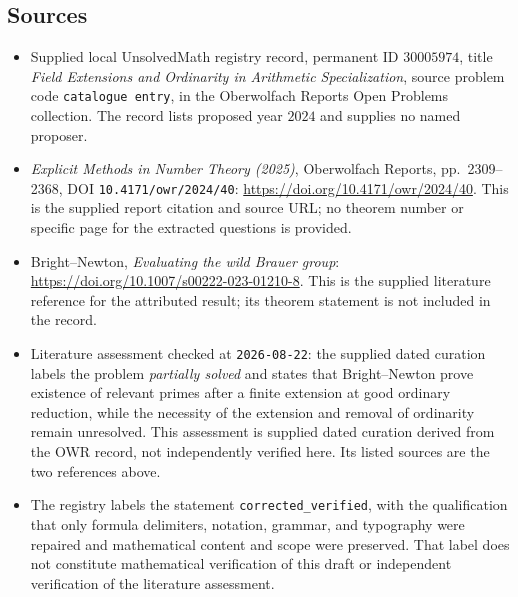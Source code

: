 \documentclass[11pt]{article}
\begin{document}
\subsection{Sources}
\begin{itemize}
\item Supplied local UnsolvedMath registry record, permanent ID \(30005974\), title \emph{Field Extensions and Ordinarity in Arithmetic Specialization}, source problem code \texttt{catalogue entry}, in the Oberwolfach Reports Open Problems collection. The record lists proposed year \(2024\) and supplies no named proposer.
\item \emph{Explicit Methods in Number Theory (2025)}, Oberwolfach Reports, pp.~2309--2368, DOI \texttt{10.4171/owr/2024/40}: \url{https://doi.org/10.4171/owr/2024/40}. This is the supplied report citation and source URL; no theorem number or specific page for the extracted questions is provided.
\item Bright--Newton, \emph{Evaluating the wild Brauer group}: \url{https://doi.org/10.1007/s00222-023-01210-8}. This is the supplied literature reference for the attributed result; its theorem statement is not included in the record.
\item Literature assessment checked at \texttt{2026-08-22}: the supplied dated curation labels the problem \emph{partially solved} and states that Bright--Newton prove existence of relevant primes after a finite extension at good ordinary reduction, while the necessity of the extension and removal of ordinarity remain unresolved. This assessment is supplied dated curation derived from the OWR record, not independently verified here. Its listed sources are the two references above.
\item The registry labels the statement \texttt{corrected\_verified}, with the qualification that only formula delimiters, notation, grammar, and typography were repaired and mathematical content and scope were preserved. That label does not constitute mathematical verification of this draft or independent verification of the literature assessment.
\end{itemize}
\end{document}
